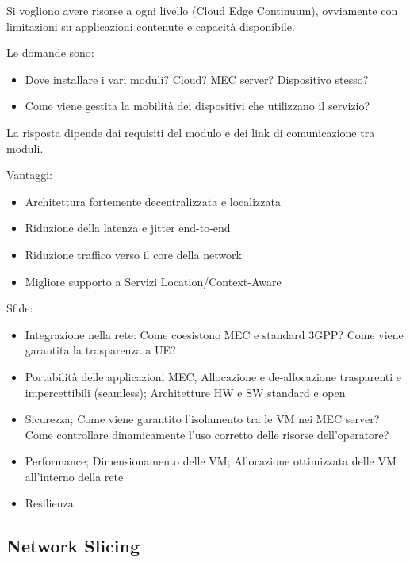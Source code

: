 Si vogliono avere risorse a ogni livello (Cloud Edge Continuum), ovviamente con limitazioni su applicazioni contenute e capacità disponibile.

Le domande sono: 
\begin{itemize}
	\item Dove installare i vari moduli? Cloud? MEC server? Dispositivo stesso? 
	
    \item Come viene gestita la mobilità dei dispositivi che utilizzano il servizio?
\end{itemize}

La risposta dipende dai requisiti del modulo e dei link di comunicazione tra moduli.

Vantaggi: 
\begin{itemize}
	\item Architettura fortemente decentralizzata e localizzata

	\item Riduzione della latenza e jitter end-to-end

	\item Riduzione traffico verso il core della network

	\item Migliore supporto a Servizi Location/Context-Aware
\end{itemize}

Sfide: 
\begin{itemize}
	\item Integrazione nella rete: Come coesistono MEC e standard 3GPP? Come viene garantita la trasparenza a UE?
    
	\item Portabilità delle applicazioni MEC, Allocazione e de-allocazione trasparenti e impercettibili (seamless); Architetture HW e SW standard e open

	\item Sicurezza; Come viene garantito l'isolamento tra le VM nei MEC server? Come controllare dinamicamente l'uso corretto delle risorse dell'operatore?

	\item Performance; Dimensionamento delle VM; Allocazione ottimizzata delle VM all'interno della rete

	\item Resilienza
\end{itemize}

\subsection{Network Slicing}

